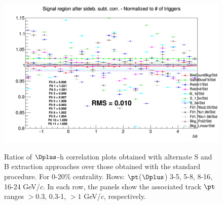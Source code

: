 \begin{figure}
{\includegraphics[width=0.31\linewidth]{Centrality_DPlus/Dplus/Systematic/0_20/Yield/Ratio_AzimCorrDistr_Dplus_Canvas_PtIntBins11to11_PoolInt_thr1dotto99dot.png}} \\
 \caption{Ratios of $\Dplus$-h correlation plots obtained with alternate S and B extraction approaches over those obtained with the standard procedure. For 0-20\% centrality. Rows: $\pt$($\Dplus$) 3-5, 5-8, 8-16, 16-24 GeV/$c$. In each row, the panels show the associated track
$\pt$ ranges $> 0.3$, 0.3-1, $> 1$ GeV/$c$, respectively.}
\label{fig:SysSandB020_Dplus}
\end{figure}

